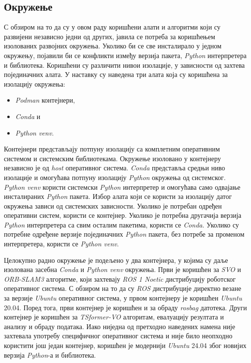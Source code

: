 \documentclass[12pt]{article}
\begin{document}
\subsection{Окружење}
С обзиром на то да су у овом раду коришћени алати и алгоритми који су развијени
независно једни од других, јавила се потреба за коришћењем изолованих развојних
окружења. Уколико би се све инсталирало у једном окружењу, појавили би се
конфликти између верзија пакета, \textit{Python} интерпретера и библиотека.
Коришћени су различити нивои изолације, у зависности од захтева појединачних
алата. У наставку су наведена три алата која су коришћена за изолацију
окружења:
\begin{itemize}
	\item \textit{Podman} контејнери,
	\item \textit{Conda} и
	\item \textit{Python venv}.
\end{itemize}
Контејнери представљају потпуну изолацију са комплетним оперативним системом и
системским библиотекама. Окружење изоловано у контејнеру независно је од
\textit{host} оперативног система. \textit{Conda} представља средњи ниво
изолације и омогућава потпуну изолацију \textit{Python} окружења од системског.
\textit{Python venv} користи системски \textit{Python} интерпретер и омогућава
само одвајање инсталираних \textit{Python} пакета. Избор алата који се користи
за изолацију датог окружења зависи од системских зависности. Уколико је
потребан одређен оперативни систем, користи се контејнер. Уколико је потребна
другачија верзија \textit{Python} интерпретера са свим осталим пакетима,
користи се \textit{Conda}. Уколико су потребне одређене верзије појединачних
\textit{Python} пакета, без потребе за променом интерпретера, користи се
\textit{Python venv}.

Целокупно радно окружење је подељено у два контејнера, у којима су даље
изолована засебна \textit{Conda} и \textit{Python venv} окружења. Први је
коришћен за \textit{SVO} и \textit{ORB-SLAM3} алгоритме, који захтевају
\textit{ROS 1 Noetic} дистрибуцију роботског оперативног система. С обзиром на
то да су \textit{ROS} дистрибуције директно везане за верзије \textit{Ubuntu}
оперативног система, у првом контејнеру је коришћен \textit{Ubuntu} 20.04.
Поред тога, први контејнер је коришћен и за обраду \textit{rosbag} датотека.
Други контејнер је коришћен за \textit{TSformer-VO} алгоритам, евалуацију
резултата и анализу и обраду података. Иако ниједна од претходно наведених
намена није захтевала употребу специфичног оперативног система и није било
неопходно користити још један контејнер, коришћен је модернији \textit{Ubuntu}
24.04 због новијих верзија \textit{Python}-а и библиотека.
\end{document}
